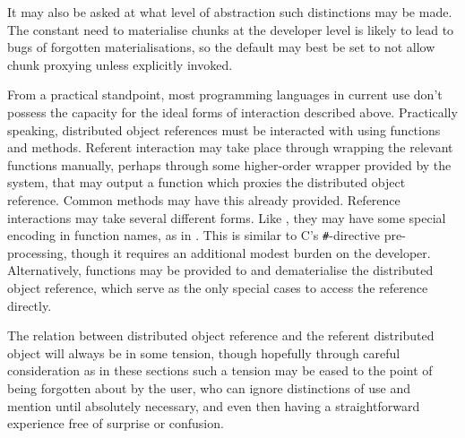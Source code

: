It may also be asked at what level of abstraction such distinctions may be made.
The constant need to materialise chunks at the developer level is likely to lead to bugs of forgotten materialisations, so the default may best be set to not allow chunk proxying unless explicitly invoked.

From a practical standpoint, most programming languages in current use don't possess the capacity for the ideal forms of interaction described above.
Practically speaking, distributed object references must be interacted with using functions and methods.
Referent interaction may take place through wrapping the relevant functions manually, perhaps through some higher-order wrapper provided by the system, that may output a function which proxies the distributed object reference.
Common methods may have this already provided.
Reference interactions may take several different forms.
Like , they may have some special encoding in function names, as in .
This is similar to C's \texttt{\#}-directive pre-processing, though it requires an additional modest burden on the developer.
Alternatively, functions may be provided to  and dematerialise the distributed object reference, which serve as the only special cases to access the reference directly.

The relation between distributed object reference and the referent distributed object will always be in some tension, though hopefully through careful consideration as in these sections such a tension may be eased to the point of being forgotten about by the user, who can ignore distinctions of use and mention until absolutely necessary, and even then having a straightforward experience free of surprise or confusion.
